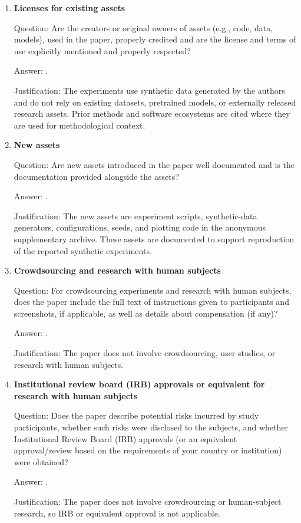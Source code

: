 \documentclass{article}
\theoremstyle{plain}
\theoremstyle{definition}
\theoremstyle{remark}
\begin{document}
\begin{enumerate}[leftmargin=5mm]
\item \textbf{Licenses for existing assets}

Question: Are the creators or original owners of assets (e.g., code, data,
models), used in the paper, properly credited and are the license and terms of
use explicitly mentioned and properly respected?

Answer: \answerNA{}.

Justification: The experiments use synthetic data generated by the authors and
do not rely on existing datasets, pretrained models, or externally released
research assets. Prior methods and software ecosystems are cited where they are
used for methodological context.

\item \textbf{New assets}

Question: Are new assets introduced in the paper well documented and is the
documentation provided alongside the assets?

Answer: \answerYes{}.

Justification: The new assets are experiment scripts, synthetic-data
generators, configurations, seeds, and plotting code in the anonymous
supplementary archive. These assets are documented to support reproduction of
the reported synthetic experiments.

\item \textbf{Crowdsourcing and research with human subjects}

Question: For crowdsourcing experiments and research with human subjects, does
the paper include the full text of instructions given to participants and
screenshots, if applicable, as well as details about compensation (if any)?

Answer: \answerNA{}.

Justification: The paper does not involve crowdsourcing, user studies, or
research with human subjects.

\item \textbf{Institutional review board (IRB) approvals or equivalent for
research with human subjects}

Question: Does the paper describe potential risks incurred by study
participants, whether such risks were disclosed to the subjects, and whether
Institutional Review Board (IRB) approvals (or an equivalent approval/review
based on the requirements of your country or institution) were obtained?

Answer: \answerNA{}.

Justification: The paper does not involve crowdsourcing or human-subject
research, so IRB or equivalent approval is not applicable.


\end{enumerate}
\end{document}
